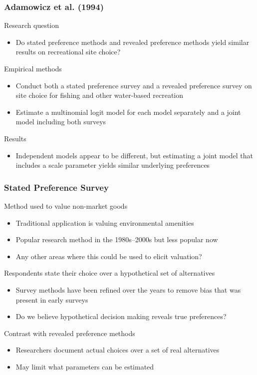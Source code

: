 \documentclass{beamer}\usepackage[]{graphicx}\usepackage[]{color}
\begin{document}
\begin{frame}\frametitle{Adamowicz et al. (1994)}
    Research question
    \begin{itemize}
    	\item Do stated preference methods and revealed preference methods yield similar results on recreational site choice?
    \end{itemize}
    \vspace{2ex}
    Empirical methods
    \begin{itemize}
    	\item Conduct both a stated preference survey and a revealed preference survey on site choice for fishing and other water-based recreation
    	\item Estimate a multinomial logit model for each model separately and a joint model including both surveys
    \end{itemize}
    \vspace{2ex}
    Results
    \begin{itemize}
    	\item Independent models appear to be different, but estimating a joint model that includes a scale parameter yields similar underlying preferences
    \end{itemize}
\end{frame}

\begin{frame}\frametitle{Stated Preference Survey}
    Method used to value non-market goods
    \begin{itemize}
    	\item Traditional application is valuing environmental amenities
    	\item Popular research method in the 1980s--2000s but less popular now
    	\item Any other areas where this could be used to elicit valuation?
    \end{itemize}
    \vspace{2ex}
    Respondents state their choice over a hypothetical set of alternatives
    \begin{itemize}
    	\item Survey methods have been refined over the years to remove bias that was present in early surveys
    	\item Do we believe hypothetical decision making reveals true preferences?
    \end{itemize}
    \vspace{2ex}
    Contrast with revealed preference methods
    \begin{itemize}
    	\item Researchers document actual choices over a set of real alternatives
    	\item May limit what parameters can be estimated
    \end{itemize}
\end{frame}
\end{document}
